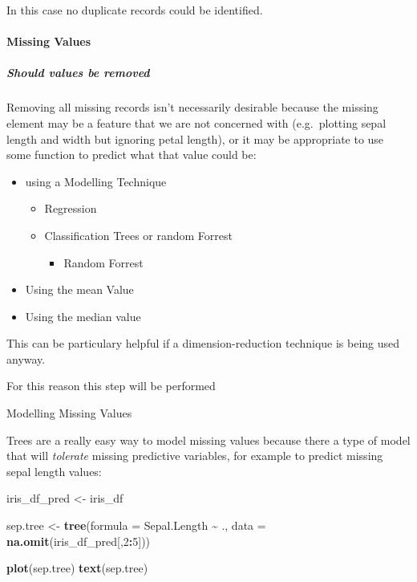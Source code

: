 \documentclass[
]{article}
\newenvironment{Shaded}{\begin{snugshade}}{\end{snugshade}}
\newcommand{\DataTypeTok}[1]{\textcolor[rgb]{0.13,0.29,0.53}{#1}}
\newcommand{\DecValTok}[1]{\textcolor[rgb]{0.00,0.00,0.81}{#1}}
\newcommand{\KeywordTok}[1]{\textcolor[rgb]{0.13,0.29,0.53}{\textbf{#1}}}
\newcommand{\NormalTok}[1]{#1}
\newcommand{\OperatorTok}[1]{\textcolor[rgb]{0.81,0.36,0.00}{\textbf{#1}}}
\newcommand{\StringTok}[1]{\textcolor[rgb]{0.31,0.60,0.02}{#1}}
\providecommand{\tightlist}{%
  \setlength{\itemsep}{0pt}\setlength{\parskip}{0pt}}
\begin{document}
In this case no duplicate records could be identified.

\hypertarget{missing-values}{%
\paragraph{Missing Values}\label{missing-values}}

\hypertarget{should-values-be-removed}{%
\subparagraph{Should values be removed}\label{should-values-be-removed}}

Removing all missing records isn't necessarily desirable because the
missing element may be a feature that we are not concerned with
(e.g.~plotting sepal length and width but ignoring petal length), or it
may be appropriate to use some function to predict what that value could
be:

\begin{itemize}
\tightlist
\item
  using a Modelling Technique

  \begin{itemize}
  \tightlist
  \item
    Regression
  \item
    Classification Trees or random Forrest

    \begin{itemize}
    \tightlist
    \item
      Random Forrest
    \end{itemize}
  \end{itemize}
\item
  Using the mean Value
\item
  Using the median value
\end{itemize}

This can be particulary helpful if a dimension-reduction technique is
being used anyway.

For this reason this step will be performed

Modelling Missing Values

Trees are a really easy way to model missing values because there a type
of model that will \emph{tolerate} missing predictive variables, for
example to predict missing sepal length values:

\begin{Shaded}
\begin{Highlighting}[]
\NormalTok{iris\_df\_pred <{-}}\StringTok{ }\NormalTok{iris\_df}

\NormalTok{sep.tree <{-}}\StringTok{ }\KeywordTok{tree}\NormalTok{(}\DataTypeTok{formula =}\NormalTok{ Sepal.Length }\OperatorTok{\textasciitilde{}}\StringTok{ }\NormalTok{., }\DataTypeTok{data =} \KeywordTok{na.omit}\NormalTok{(iris\_df\_pred[,}\DecValTok{2}\OperatorTok{:}\DecValTok{5}\NormalTok{]))}

\KeywordTok{plot}\NormalTok{(sep.tree)}
\KeywordTok{text}\NormalTok{(sep.tree)}
\end{Highlighting}
\end{Shaded}
\end{document}
